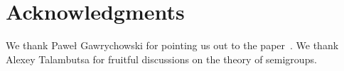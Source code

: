 \documentclass[a4paper,UKenglish,cleveref, autoref]{lipics-v2019}
\begin{document}
\section*{Acknowledgments}
We thank Paweł Gawrychowski for pointing us out to the paper~\cite{DBLP:journals/ijcga/ChazelleR91}. We thank Alexey Talambutsa for fruitful discussions on the theory of semigroups.




%
%
%
%
%
%
\end{document}
